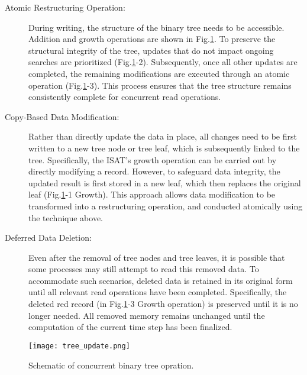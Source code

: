 \begin{description}
	\item [Atomic Restructuring Operation:] During writing, the structure of the binary tree needs to be accessible. Addition and growth operations are shown in Fig.\ref{MPI_op}. To preserve the structural integrity of the tree, updates that do not impact ongoing searches are prioritized (Fig.\ref{MPI_op}-2).  Subsequently, once all other updates are completed, the remaining modifications are executed through an atomic operation (Fig.\ref{MPI_op}-3). This process ensures that the tree structure remains consistently complete for concurrent read operations.

	\item [Copy-Based Data Modification:] Rather than directly update the data in place, all changes need to be first written to a new tree node or tree leaf, which is subsequently linked to the tree. Specifically, the ISAT's growth operation can be carried out by directly modifying a record. However, to safeguard data integrity, the updated result is first stored in a new leaf, which then replaces the original leaf (Fig.\ref{MPI_op}-1 Growth). This approach allows data modification to be transformed into a restructuring operation, and conducted atomically using the technique above.

	\item [Deferred Data Deletion:] Even after the removal of tree nodes and tree leaves, it is possible that some processes may still attempt to read this removed data. To accommodate such scenarios, deleted data is retained in its original form until all relevant read operations have been completed. Specifically,  the deleted red record (in Fig.\ref{MPI_op}-3 Growth operation) is preserved until it is no longer needed. All removed memory remains unchanged until the computation of the current time step has been finalized.
\end{description}




\begin{figure}[htbp]
	\centering
	\texttt{[image: tree\_update.png]}
	\caption{Schematic of concurrent binary tree opration.}
	\label{MPI_op}
\end{figure}


